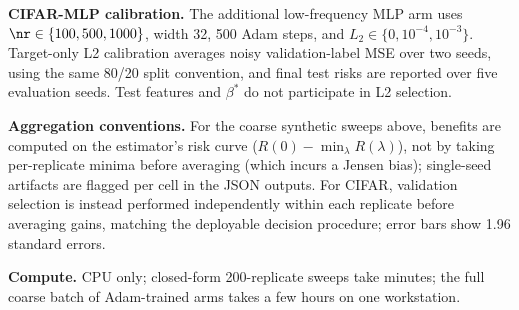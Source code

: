 \textbf{CIFAR-MLP calibration.} The additional low-frequency MLP arm uses $\nr\in\{100,500,1000\}$, width 32, 500 Adam steps, and $L_2\in\{0,10^{-4},10^{-3}\}$. Target-only L2 calibration averages noisy validation-label MSE over two seeds, using the same 80/20 split convention, and final test risks are reported over five evaluation seeds. Test features and $\beta^*$ do not participate in L2 selection.

\textbf{Aggregation conventions.} For the coarse synthetic sweeps above, benefits are computed on the estimator's risk curve ($R(0)-\min_\lambda R(\lambda)$), not by taking per-replicate minima before averaging (which incurs a Jensen bias); single-seed artifacts are flagged per cell in the JSON outputs. For CIFAR, validation selection is instead performed independently within each replicate before averaging gains, matching the deployable decision procedure; error bars show 1.96 standard errors.

\textbf{Compute.} CPU only; closed-form 200-replicate sweeps take minutes; the full coarse batch of Adam-trained arms takes a few hours on one workstation.
